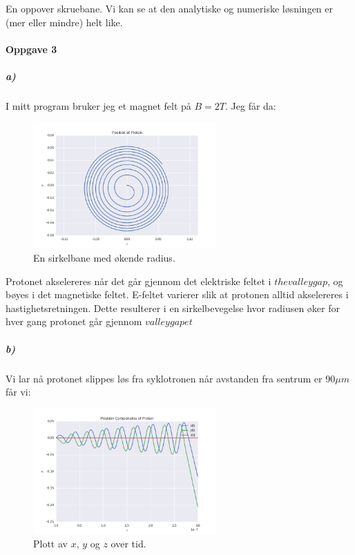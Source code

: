 \documentclass[a4paper,norsk, 10pt]{article}
\begin{document}
En oppover skruebane. Vi kan se at den analytiske og numeriske løsningen er (mer eller mindre) helt like.


\paragraph*{Oppgave 3}
\subparagraph*{a)}
I mitt program bruker jeg et magnet felt på $B = 2T$. Jeg får da:

\begin{figure}[H]
\begin{center}
\includegraphics[width = 70mm]{opp3aPos.png}
\caption{En sirkelbane med økende radius.}
\end{center}
\end{figure}

Protonet akselereres når det går gjennom det elektriske feltet i $the valley gap$, og bøyes i det magnetiske feltet. E-feltet varierer slik at protonen alltid akselereres i hastighetsretningen. Dette resulterer i en sirkelbevegelse hvor radiusen øker for hver gang protonet går gjennom $valley gapet$

\subparagraph*{b)}

Vi lar nå protonet slippes løs fra syklotronen når avstanden fra sentrum er $90 \mu m$ får vi:

\begin{figure}[H]
\begin{center}
\includegraphics[width = 70mm]{opp3bPosKomp.png}
\caption{Plott av $x$, $y$ og $z$ over tid.}
\end{center}
\end{figure}
\end{document}
